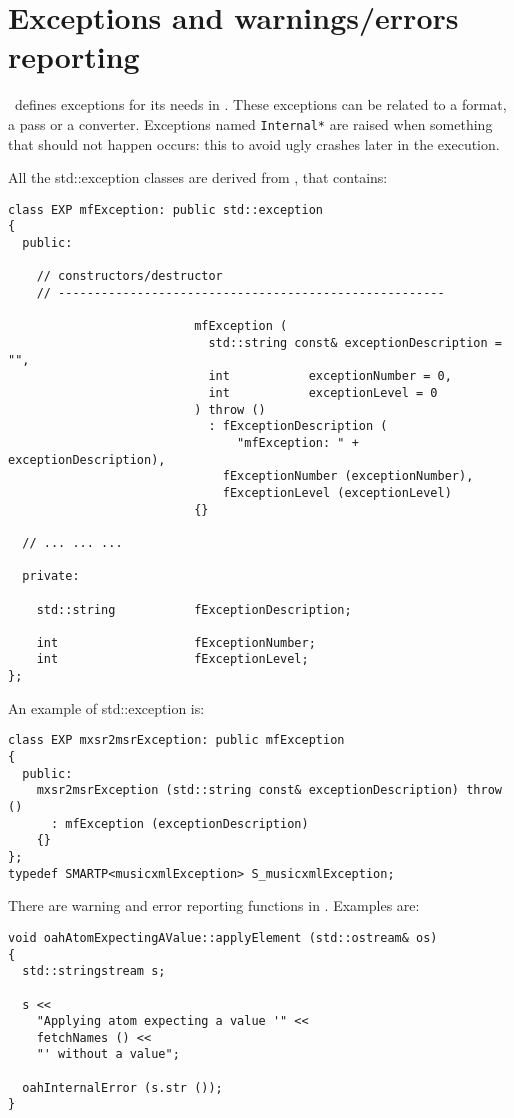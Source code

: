 \section{Exceptions and warnings/errors reporting}

\mf\ defines exceptions for its needs in . These exceptions can be related to a format, a pass or a converter. Exceptions named {\tt *Internal*} are raised when something that should not happen occurs: this to avoid ugly crashes later in the execution.

All the std::exception classes are derived from {\tt }, that contains:
\begin{lstlisting}[language=CPlusPlus]
class EXP mfException: public std::exception
{
  public:

    // constructors/destructor
    // ------------------------------------------------------

                          mfException (
                            std::string const& exceptionDescription = "",
                            int           exceptionNumber = 0,
                            int           exceptionLevel = 0
                          ) throw ()
                            : fExceptionDescription (
                                "mfException: " + exceptionDescription),
                              fExceptionNumber (exceptionNumber),
                              fExceptionLevel (exceptionLevel)
                          {}

  // ... ... ...

  private:

    std::string           fExceptionDescription;

    int                   fExceptionNumber;
    int                   fExceptionLevel;
};
\end{lstlisting}

An example of std::exception is:
\begin{lstlisting}[language=CPlusPlus]
class EXP mxsr2msrException: public mfException
{
  public:
    mxsr2msrException (std::string const& exceptionDescription) throw ()
      : mfException (exceptionDescription)
    {}
};
typedef SMARTP<musicxmlException> S_musicxmlException;
\end{lstlisting}

There are warning and error reporting functions in .
Examples are:
\begin{lstlisting}[language=CPlusPlus]
void oahAtomExpectingAValue::applyElement (std::ostream& os)
{
  std::stringstream s;

  s <<
    "Applying atom expecting a value '" <<
    fetchNames () <<
    "' without a value";

  oahInternalError (s.str ());
}
\end{lstlisting}

